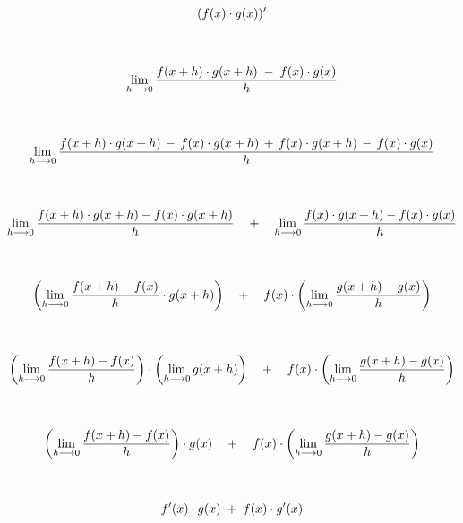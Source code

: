 \documentclass{beamer}
\begin{document}
\begin{frame}
\begin{gather*}
 (f(x)\cdot g(x))'  \\
\rule{0pt}{24pt} \\
 \lim_{h\longrightarrow 0} \frac{f(x+h)\cdot g(x+h) \; - \; f(x)\cdot g(x)}{h} \\ 
\rule{0pt}{24pt} \\
 \lim_{h\longrightarrow 0} \frac{f(x+h) \cdot g(x+h) \, - \, f(x) \cdot g(x+h) \, + \, f(x) \cdot g(x+h) \, - \, f(x) \cdot g(x)}{h} \\
\rule{0pt}{24pt} \\
\lim_{h\longrightarrow 0} \frac{f(x+h)\cdot g(x+h) - f(x) \cdot g(x+h)}{h} \quad + \quad \lim_{h\longrightarrow 0} \frac{f(x) \cdot g(x+h) - f(x) \cdot g(x)}{h} \\
 \rule{0pt}{24pt}\\
\left( \lim_{h\longrightarrow 0} \frac{f(x+h)-f(x)}{h}  \cdot g(x+h) \right) \quad + \quad f(x) \cdot \left( \lim_{h\longrightarrow 0} \frac{g(x+h)-g(x)}{h}  \right) \\
\rule{0pt}{24pt} \\
\left( \lim_{h\longrightarrow 0} \frac{f(x+h)-f(x)}{h} \right) \cdot \left( \lim_{h\longrightarrow 0} g(x+h) \right) \quad + \quad f(x) \cdot \left( \lim_{h\longrightarrow 0} \frac{g(x+h)-g(x)}{h} \right) \\
\rule{0pt}{24pt} \\
\left( \lim_{h\longrightarrow 0} \frac{f(x+h)-f(x)}{h} \right) \cdot g(x) \quad + \quad f(x) \cdot \left( \lim_{h\longrightarrow 0} \frac{g(x+h)-g(x)}{h} \right) \\
\rule{0pt}{24pt} \\
 f'(x) \cdot g(x) \; + \; f(x) \cdot g'(x) \\
\end{gather*}
\end{frame}
\end{document}
